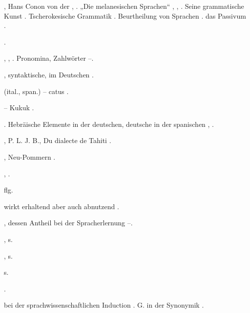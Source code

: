 \begin{register}
, Hans Conon von der \pageref{sp.30}, \pageref{sp.49}. „Die melanesischen Sprachen“ \pageref{sp.74}, \sed{\pageref{sp.151},} \pageref{sp.280}, \pageref{sp.406}. Seine grammatische Kunst \pageref{sp.112}. Tscherokesische Grammatik \pageref{sp.358}.  Beurtheilung von Sprachen \pageref{sp.427}.  das Passivum \pageref{sp.481}.


 \pageref{sp.248}.

 \pageref{sp.142}, \pageref{sp.282}, \pageref{sp.307}. Pronomina, Zahlwörter \pageref{sp.160}–\pageref{sp.161}.

, syntaktische, im Deutschen \sed{\pageref{sp.243},} \pageref{sp.272}.

 (ital., span.) – catus \pageref{sp.190}.


 – Kukuk \pageref{sp.208}.

 \pageref{sp.45}. Hebräische Elemente in der deutschen, deutsche in der spanischen \pageref{sp.288}, \pageref{sp.289}.

, P. L. J. B., Du dialecte de Tahiti \pageref{sp.463}.

, Neu-Pommern \pageref{sp.165}.

 \pageref{sp.2}, \pageref{sp.311}.


 \pageref{sp.319} flg.

 wirkt erhaltend aber auch abnutzend \pageref{sp.182}.

, dessen Antheil bei der Spracherlernung \pageref{sp.63}–\pageref{sp.64}.

, s. 


, s. 

 \sed{\pageref{sp.282},} s. 

 \pageref{sp.45}.

 bei der sprachwissenschaftlichen Induction \pageref{sp.48}. G. in der Synonymik \pageref{sp.100}.


\end{register}
